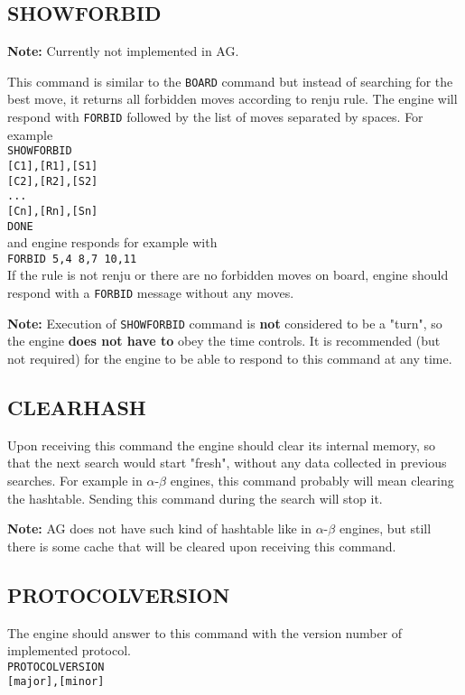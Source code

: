 \documentclass[12pt,a4paper]{article}
\begin{document}
\subsection{SHOWFORBID}
\label{cmd_showforbid}
\textbf{Note:} Currently not implemented in AG.

This command is similar to the \texttt{BOARD} command but instead of searching for the best move, it returns all forbidden moves according to renju rule. The engine will respond with \texttt{FORBID} followed by the list of moves separated by spaces. For example\\
\texttt{SHOWFORBID}\\
\texttt{[C1],[R1],[S1]} \\
\texttt{[C2],[R2],[S2]} \\
\texttt{...}\\
\texttt{[Cn],[Rn],[Sn]} \\
\texttt{DONE}\\
and engine responds for example with\\
\texttt{FORBID 5,4 8,7 10,11}\\
If the rule is not renju or there are no forbidden moves on board, engine should respond with a \texttt{FORBID} message without any moves.

\textbf{Note:} Execution of \texttt{SHOWFORBID} command is \textbf{not} considered to be a "turn", so the engine \textbf{does not have to} obey the time controls. It is recommended (but not required) for the engine to be able to respond to this command at any time.


\subsection{CLEARHASH}
\label{cmd_clearhash}
Upon receiving this command the engine should clear its internal memory, so that the next search would start "fresh", without any data collected in previous searches. For example in $\alpha$-$\beta$ engines, this command probably will mean clearing the hashtable. Sending this command during the search will stop it.

\textbf{Note:} AG does not have such kind of hashtable like in $\alpha$-$\beta$ engines, but still there is some cache that will be cleared upon receiving this command.


\subsection{PROTOCOLVERSION}
\label{cmd_protocol_version}
The engine should answer to this command with the version number of implemented protocol.\\
\texttt{PROTOCOLVERSION} \\
\texttt{[major],[minor]} \\
\end{document}
